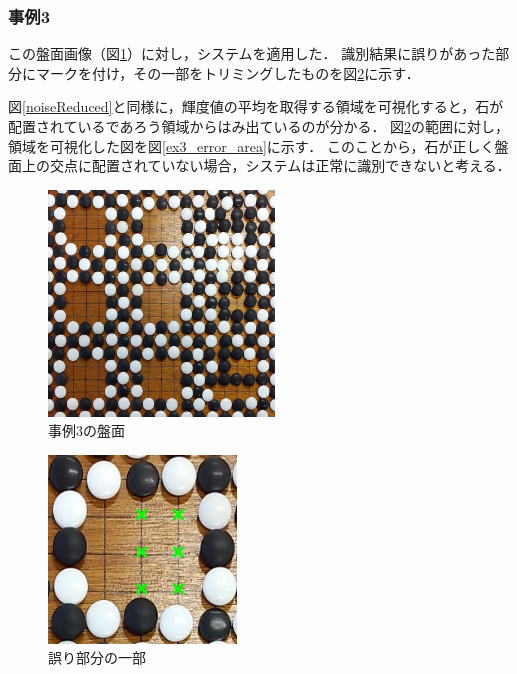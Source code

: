 \documentclass[openright]{nitocs}
\numberwithin{equation}{section}
\begin{document}
            \subsubsection{事例3} %
                この盤面画像（図\ref{ex3}）に対し，システムを適用した．
                識別結果に誤りがあった部分にマークを付け，その一部をトリミングしたものを図\ref{ex3_error}に示す．

                図\ref{noiseReduced}と同様に，輝度値の平均を取得する領域を可視化すると，石が配置されているであろう領域からはみ出ているのが分かる．
                図\ref{ex3_error}の範囲に対し，領域を可視化した図を図\ref{ex3_error_area}に示す．
                このことから，石が正しく盤面上の交点に配置されていない場合，システムは正常に識別できないと考える．
                \begin{figure}[tb] %
                    \begin{center}
                    \includegraphics[width=60mm,height=60mm]{DSC_0098/boardImg.jpg} 
                    \caption{事例3の盤面}
                    \label{ex3}
                    \end{center}
                \end{figure}

                \begin{figure}[tb] %
                    \begin{center}
                    \includegraphics[width=50mm,height=50mm]{DSC_0098/TRIM_resultCompare.jpg} 
                    \caption{誤り部分の一部}
                    \label{ex3_error}
                    \end{center}
                \end{figure}
\end{document}
